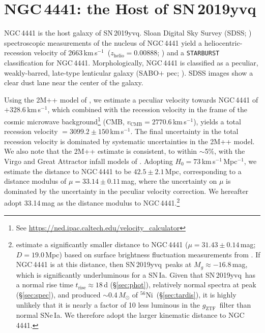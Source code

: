 \documentclass[twocolumn]{aastex63}
\newcommand{\fromkate}[1]{{\color{brown} fromKM: {#1}}}
\newcommand{\todo}[1]{{\color{magenta} to-do: {#1}}}
\newcommand{\gztf}{$g_\mathrm{ZTF}$}
\newcommand{\kms}{km\,s$^{-1}$}
\newcommand{\radni}{$^{56}$Ni}
\newcommand{\sn}{SN\,2019yvq}
\begin{document}
\section{NGC\,4441: the Host of \sn}\label{sec:host}

NGC\,4441 is the host galaxy of \sn. Sloan Digital Sky Survey (SDSS;
\citealt{York00}) spectroscopic measurements of the nucleus of NGC\,4441
yield a heliocentric-recession velocity of 2663\,\kms\ ($z_\mathrm{helio} =
0.00888$; \citealt{Abolfathi18}) and a \texttt{STARBURST} classification for
NGC\,4441. Morphologically, NGC\,4441 is classified as a peculiar,
weakly-barred, late-type lenticular galaxy (SABO$+$ pec;
\citealt{de-Vaucouleurs91}). SDSS images show a clear dust lane near the
center of the galaxy.

Using the 2M++ model of \citet{Carrick15}, we estimate a peculiar velocity
towards NGC\,4441 of $+328.6$\,\kms, which combined with the recession
velocity in the frame of the cosmic microwave background\footnote{See
\url{https://ned.ipac.caltech.edu/velocity_calculator}} (CMB,
$v_\mathrm{CMB} = 2770.6$\,\kms), yields a total recession velocity $=
3099.2 \pm 150$\,\kms. The final uncertainty in the total recession velocity
is dominated by systematic uncertainties in the 2M++ model. We also note
that the 2M++ estimate is consistent, to within $\sim$5\%, with the Virgo
and Great Attractor infall models of \citet{Mould00}. Adopting $H_0 =
73$\,\kms\,Mpc$^{-1}$, we estimate the distance to NGC\,4441 to be $42.5 \pm
2.1$\,Mpc, corresponding to a distance modulus of $\mu = 33.14 \pm
0.11$\,mag, where the uncertainty on $\mu$ is dominated by the uncertainty
in the peculiar velocity correction. We hereafter adopt 33.14\,mag as the
distance modulus to NGC\,4441.\footnote{\citet{Tully13} estimate a
significantly smaller distance to NGC\,4441 ($\mu = 31.43 \pm 0.14$\,mag; $D
= 19.0$\,Mpc) based on surface brightness fluctuation measurements from
\citet{Tonry01}. If NGC\,4441 is at this distance, then \sn\ peaks at $M_g
\approx -16.8$\,mag, which is significantly underluminous for a SN\,Ia.
Given that \sn\ has a normal rise time $t_\mathrm{rise} \approx 18$\,d
(\S\ref{sec:phot}), relatively normal spectra at peak (\S\ref{sec:spec}),
and produced $\sim$0.4\,$M_\odot$ of \radni\ (\S\ref{sec:tardis}), it is
highly unlikely that it is nearly a factor of 10 less luminous in the \gztf\
filter than normal SNe\,Ia. We therefore adopt the larger kinematic distance
to NGC\,4441.}
\end{document}

